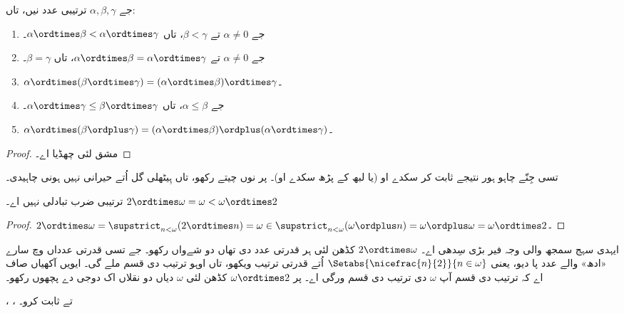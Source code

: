 \documentclass[../../../include/open-logic-section]{subfiles}
\begin{document}
\begin{lem}
جے $\alpha, \beta, \gamma$ ترتیبی عدد نیں، تاں:
\begin{enumerate}
	\item{} جے $\alpha \neq 0$ تے $\beta < \gamma$،
	تاں $\alpha \ordtimes \beta < \alpha \ordtimes \gamma$۔
	\item{} جے $\alpha \neq 0$ تے $\alpha \ordtimes
	\beta = \alpha\ordtimes\gamma$، تاں $\beta = \gamma$۔
	\item{}  $\alpha \ordtimes (\beta \ordtimes
	\gamma) = (\alpha \ordtimes \beta) \ordtimes \gamma$۔
	\item{} جے $\alpha \leq \beta$، تاں $\alpha
	\ordtimes \gamma \leq \beta \ordtimes \gamma$۔
	\item{}  $\alpha \ordtimes (\beta \ordplus
	\gamma) = (\alpha \ordtimes \beta )\ordplus (\alpha\ordtimes
	\gamma)$۔
\end{enumerate}
\end{lem}

\begin{proof}
مشق لئی چھڈیا اے۔
\end{proof}

تسی جِنّے چاہو ہور نتیجے ثابت کر سکدے او (یا لبھ کے پڑھ سکدے او)۔ پر  نوں چیتے رکھو، تاں ہِیٹھلی گل اُتے حیرانی نہیں ہونی چاہیدی۔

\begin{prop}
ترتیبی ضرب تبادلی نہیں اے۔ $2 \ordtimes \omega  =
\omega < \omega \ordtimes 2$
\end{prop}

\begin{proof}
$2 \ordtimes \omega = \supstrict_{n < \omega}(2\ordtimes  n) = \omega \in \supstrict_{n < \omega}(\omega \ordplus n) = \omega \ordplus \omega = \omega \ordtimes 2$۔
\end{proof}
\noindent
ایہدی سہج سمجھ والی وجہ فیر بڑی سِدھی اے۔ $2
\ordtimes \omega$ کڈھن لئی ہر قدرتی عدد دی تھاں دو شےواں رکھو۔ جے تسی قدرتی عدداں وچ سارے «ادھ» والے عدد پا دیو، یعنی $\Setabs{\nicefrac{n}{2}}{n \in \omega}$ اُتے قدرتی ترتیب ویکھو، تاں اوہو ترتیب دی قسم ملے گی۔ ایویں آکھیاں صاف اے کہ ترتیب دی قسم آپ $\omega$ دی ترتیب دی قسم ورگی اے۔ پر $\omega \ordtimes 2$ کڈھن لئی $\omega$ دیاں دو نقلاں اک دوجی دے پچھوں رکھو۔

\begin{prob}
،
،
تے
ثابت کرو۔
\end{prob}
\end{document}
